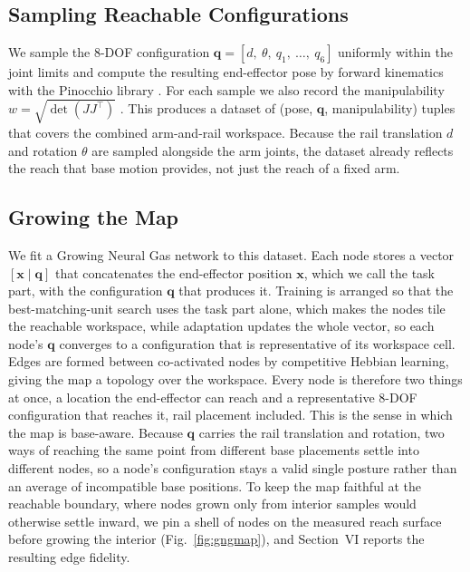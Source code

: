 \documentclass[conference]{IEEEtran}
\begin{document}
\subsection{Sampling Reachable Configurations}

We sample the 8-DOF configuration
$\mathbf{q} = [d,\ \theta,\ q_1,\ \ldots,\ q_6]$ uniformly within the joint limits
and compute the resulting end-effector pose by forward kinematics with the
Pinocchio library \cite{Carpentier2019}. For each sample we also record the
manipulability $w = \sqrt{\det(JJ^\top)}$ \cite{Yoshikawa1985}. This produces a dataset of
(pose, $\mathbf{q}$, manipulability) tuples that covers the combined
arm-and-rail workspace. Because the rail translation $d$ and rotation $\theta$ are
sampled alongside the arm joints, the dataset already reflects the reach that base
motion provides, not just the reach of a fixed arm.

\subsection{Growing the Map}

We fit a Growing Neural Gas network \cite{Fritzke1995} to this dataset. Each node
stores a vector $[\mathbf{x} \mid \mathbf{q}]$ that concatenates the end-effector
position $\mathbf{x}$, which we call the task part, with the configuration
$\mathbf{q}$ that produces it. Training is arranged so that the best-matching-unit
search uses the task part alone, which makes the nodes tile the reachable
workspace, while adaptation updates the whole vector, so each node's $\mathbf{q}$
converges to a configuration that is representative of its workspace cell. Edges
are formed between co-activated nodes by competitive Hebbian learning, giving the
map a topology over the workspace. Every node is therefore two things at once, a
location the end-effector can reach and a representative 8-DOF configuration that
reaches it, rail placement included. This is the sense in which the map is
base-aware. Because $\mathbf{q}$ carries the rail translation and rotation, two ways
of reaching the same point from different base placements settle into different
nodes, so a node's configuration stays a valid single posture rather than an average
of incompatible base positions. To keep the map faithful at the reachable boundary,
where nodes grown only from interior samples would otherwise settle inward, we pin a
shell of nodes on the measured reach surface before growing the interior
(Fig.~\ref{fig:gngmap}), and Section~VI reports the resulting edge fidelity.
\end{document}
